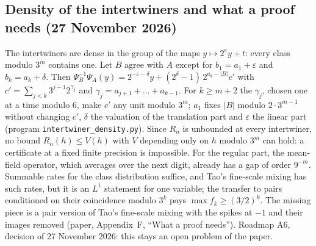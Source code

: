 \documentclass[11pt]{article}
\theoremstyle{remark}
\begin{document}
\subsection*{Density of the intertwiners and what a proof needs (27 November 2026)}
The intertwiners are dense in the group of the maps $y\mapsto2^ey+t$: every class modulo $3^m$ contains one. Let $B$ agree with $A$ except for $b_1=a_1+\varepsilon$ and $b_k=a_k+\delta$. Then $\Psi_B^{-1}\Psi_A(y)=2^{-\varepsilon-\delta}y+(2^\delta-1)\,2^{a_k-|B|}c'$ with $c'=\sum_{j<k}3^{j-1}2^{\gamma_j}$ and $\gamma_j=a_{j+1}+\dots+a_{k-1}$. For $k\ge m+2$ the $\gamma_j$, chosen one at a time modulo $6$, make $c'$ any unit modulo $3^m$; $a_1$ fixes $|B|$ modulo $2\cdot3^{m-1}$ without changing $c'$, $\delta$ the valuation of the translation part and $\varepsilon$ the linear part (program \texttt{intertwiner\_density.py}). Since $R_n$ is unbounded at every intertwiner, no bound $R_n(h)\le V(h)$ with $V$ depending only on $h$ modulo $3^m$ can hold: a certificate at a fixed finite precision is impossible. For the regular part, the mean-field operator, which averages over the next digit, already has a gap of order $9^{-m}$. Summable rates for the class distribution suffice, and Tao's fine-scale mixing has such rates, but it is an $L^1$ statement for one variable; the transfer to pairs conditioned on their coincidence modulo $3^k$ pays $\max f_k\ge(3/2)^k$. The missing piece is a pair version of Tao's fine-scale mixing with the spikes at $-1$ and their images removed (paper, Appendix~F, ``What a proof needs''). Roadmap A6, decision of 27 November 2026: this stays an open problem of the paper.
\end{document}
